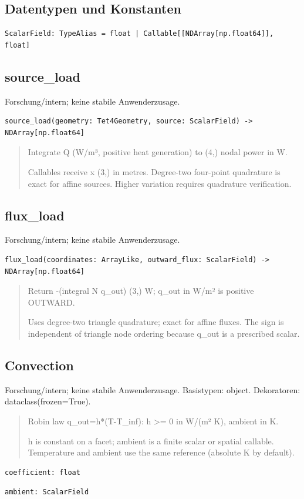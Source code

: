 \subsection*{Datentypen und Konstanten}
\begin{lstlisting}
ScalarField: TypeAlias = float | Callable[[NDArray[np.float64]], float]
\end{lstlisting}
\subsection{source\_load}
Forschung/intern; keine stabile Anwenderzusage.
\begin{lstlisting}
source_load(geometry: Tet4Geometry, source: ScalarField) -> NDArray[np.float64]
\end{lstlisting}
\begin{quote}
Integrate Q (W/m³, positive heat generation) to (4,) nodal power in W.\par Callables receive x (3,) in metres. Degree-two four-point quadrature is exact for affine sources. Higher variation requires quadrature verification.
\end{quote}
\subsection{flux\_load}
Forschung/intern; keine stabile Anwenderzusage.
\begin{lstlisting}
flux_load(coordinates: ArrayLike, outward_flux: ScalarField) -> NDArray[np.float64]
\end{lstlisting}
\begin{quote}
Return -(integral N q\_out) (3,) W; q\_out in W/m² is positive OUTWARD.\par Uses degree-two triangle quadrature; exact for affine fluxes. The sign is independent of triangle node ordering because q\_out is a prescribed scalar.
\end{quote}
\subsection{Convection}
Forschung/intern; keine stabile Anwenderzusage.
Basistypen: object. Dekoratoren: dataclass(frozen=True).
\begin{quote}
Robin law q\_out=h*(T-T\_inf): h >= 0 in W/(m² K), ambient in K.\par h is constant on a facet; ambient is a finite scalar or spatial callable. Temperature and ambient use the same reference (absolute K by default).
\end{quote}
\begin{lstlisting}
coefficient: float
\end{lstlisting}
\begin{lstlisting}
ambient: ScalarField
\end{lstlisting}
